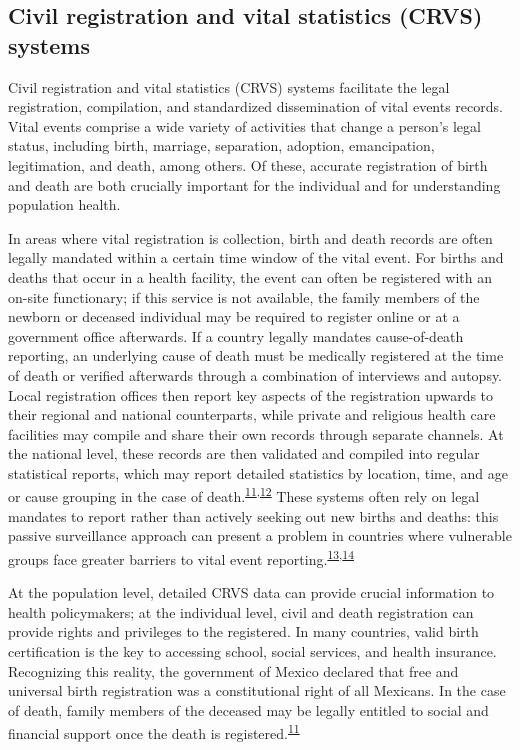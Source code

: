 \documentclass[
]{article}
\begin{document}
\hypertarget{civil-registration-and-vital-statistics-crvs-systems}{%
\subsection{Civil registration and vital statistics (CRVS) systems}\label{civil-registration-and-vital-statistics-crvs-systems}}

Civil registration and vital statistics (CRVS) systems facilitate the legal registration, compilation, and standardized dissemination of vital events records. Vital events comprise a wide variety of activities that change a person's legal status, including birth, marriage, separation, adoption, emancipation, legitimation, and death, among others. Of these, accurate registration of birth and death are both crucially important for the individual and for understanding population health.

In areas where vital registration is collection, birth and death records are often legally mandated within a certain time window of the vital event. For births and deaths that occur in a health facility, the event can often be registered with an on-site functionary; if this service is not available, the family members of the newborn or deceased individual may be required to register online or at a government office afterwards. If a country legally mandates cause-of-death reporting, an underlying cause of death must be medically registered at the time of death or verified afterwards through a combination of interviews and autopsy. Local registration offices then report key aspects of the registration upwards to their regional and national counterparts, while private and religious health care facilities may compile and share their own records through separate channels. At the national level, these records are then validated and compiled into regular statistical reports, which may report detailed statistics by location, time, and age or cause grouping in the case of death.\textsuperscript{\protect\hyperlink{ref-Setel2007}{11},\protect\hyperlink{ref-UnitedNationsStatisticsDivision2014}{12}} These systems often rely on legal mandates to report rather than actively seeking out new births and deaths: this passive surveillance approach can present a problem in countries where vulnerable groups face greater barriers to vital event reporting.\textsuperscript{\protect\hyperlink{ref-Fisker2019}{13},\protect\hyperlink{ref-Hernandez2012}{14}}

At the population level, detailed CRVS data can provide crucial information to health policymakers; at the individual level, civil and death registration can provide rights and privileges to the registered. In many countries, valid birth certification is the key to accessing school, social services, and health insurance. Recognizing this reality, the government of Mexico declared that free and universal birth registration was a constitutional right of all Mexicans. In the case of death, family members of the deceased may be legally entitled to social and financial support once the death is registered.\textsuperscript{\protect\hyperlink{ref-Setel2007}{11}}
\end{document}
